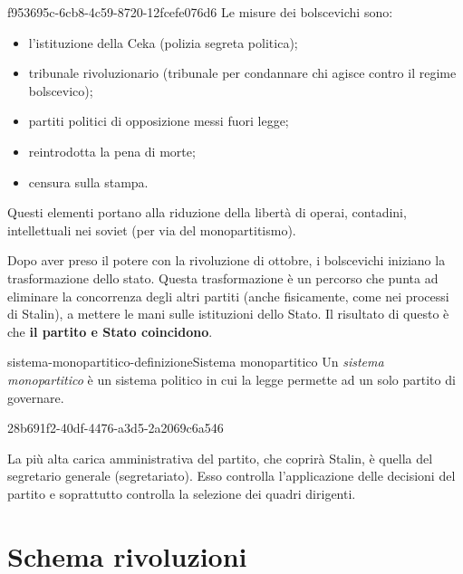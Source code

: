 \documentclass[preview]{standalone}
\begin{document}
\begin{snippet}{f953695c-6cb8-4c59-8720-12fcefe076d6}
    Le misure dei bolscevichi sono:
    \begin{itemize}
        \item l'istituzione della Ceka (polizia segreta politica);
        \item tribunale rivoluzionario (tribunale per condannare chi agisce contro il regime bolscevico);
        \item partiti politici di opposizione messi fuori legge;
        \item reintrodotta la pena di morte;
        \item censura sulla stampa.
    \end{itemize}
    Questi elementi portano alla riduzione della libertà di operai, contadini, intellettuali
    nei soviet (per via del monopartitismo).
    
    Dopo aver preso il potere con la rivoluzione di ottobre, i bolscevichi iniziano la trasformazione
    dello stato. Questa trasformazione è un percorso che punta ad eliminare la concorrenza
    degli altri partiti (anche fisicamente, come nei processi di Stalin),
    a mettere le mani sulle istituzioni dello Stato.
    Il risultato di questo è che \textbf{il partito e Stato coincidono}.
\end{snippet}

\begin{snippetdefinition}{sistema-monopartitico-definizione}{Sistema monopartitico}
    Un \textit{sistema monopartitico} è un sistema politico in cui la legge
    permette ad un solo partito di governare.
\end{snippetdefinition}

\begin{snippet}{28b691f2-40df-4476-a3d5-2a2069c6a546}

    La più alta carica amministrativa del partito, che coprirà Stalin,
    è quella del segretario generale (segretariato).
    Esso controlla l'applicazione delle decisioni del partito e soprattutto controlla
    la selezione dei quadri dirigenti.
\end{snippet}

\section{Schema rivoluzioni}
\end{document}
